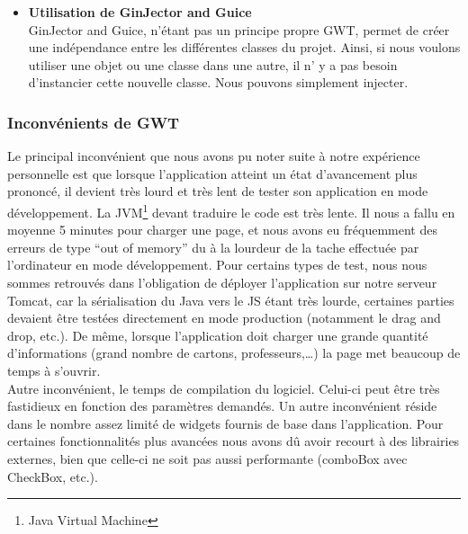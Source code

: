 \begin{itemize}
\item \textbf{Utilisation de GinJector and Guice}\\
GinJector and Guice, n'étant pas un principe propre GWT, permet de créer une indépendance entre les différentes classes du projet. Ainsi, si nous voulons utiliser une objet ou une classe dans une autre, il n' y a pas besoin d'instancier cette nouvelle classe. Nous pouvons simplement injecter.
\end{itemize}





\subsubsection{Inconvénients de GWT}
Le principal inconvénient que nous avons pu noter suite à notre expérience personnelle est que lorsque l'application atteint un état d'avancement plus prononcé, il devient très lourd et très lent de tester son application en mode développement. La JVM\footnote{Java Virtual Machine} devant traduire le code est très lente. Il nous a fallu en moyenne 5 minutes pour charger une page, et nous avons eu fréquemment des erreurs de type \enquote{out of memory} du à la lourdeur de la tache effectuée par l'ordinateur en mode développement.
\newline
\indent
Pour certains types de test, nous nous sommes retrouvés dans l'obligation de déployer l'application sur notre serveur Tomcat, car la sérialisation du Java vers le JS étant très lourde, certaines parties devaient être testées directement en mode production (notamment le drag and drop, etc.). 
\newline
\indent
De même, lorsque l'application doit charger une grande quantité d'informations (grand nombre de cartons, professeurs,…) la page met beaucoup de temps à s'ouvrir.\\
\newline
\indent
Autre inconvénient, le temps de compilation du logiciel. Celui-ci peut être très fastidieux en fonction des paramètres demandés. 
\newline
\indent
Un autre inconvénient réside dans le nombre assez limité de widgets fournis de base dans l'application. Pour certaines fonctionnalités plus avancées nous avons dû avoir recourt à des librairies externes, bien que celle-ci ne soit pas aussi performante (comboBox avec CheckBox, etc.).

